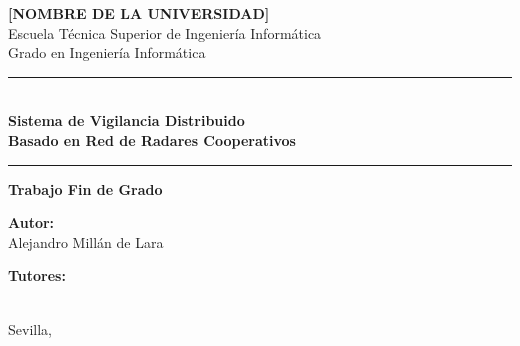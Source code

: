 \begin{titlepage}
\centering

\vspace*{1cm}


{\Large \textbf{[NOMBRE DE LA UNIVERSIDAD]}}\\[0.3cm]
{\large Escuela Técnica Superior de Ingeniería Informática}\\[0.3cm]
{\large Grado en Ingeniería Informática}

\vspace{1.5cm}
\rule{\linewidth}{0.5mm}\\[0.4cm]

{\huge \bfseries Sistema de Vigilancia Distribuido\\[0.3cm]
Basado en Red de Radares Cooperativos}\\[0.4cm]

\rule{\linewidth}{0.5mm}

\vspace{1.5cm}

{\large \textbf{Trabajo Fin de Grado}}

\vfill

\begin{minipage}{0.45\textwidth}
    \begin{flushleft}
        \textbf{Autor:}\\
        Alejandro Millán de Lara
    \end{flushleft}
\end{minipage}
\hfill
\begin{minipage}{0.45\textwidth}
    \begin{flushright}
        \textbf{Tutores:}\\
        [Nombre tutor Fernando]\\
        [Nombre tutora Cristina]
    \end{flushright}
\end{minipage}

\vspace{1.5cm}

{\large Sevilla, \the\year}

\end{titlepage}
\thispagestyle{empty}
\cleardoublepage
